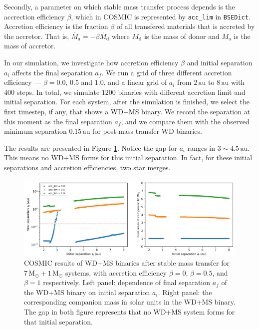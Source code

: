 \documentclass[12pt]{article}
\newcommand{\Msun}{\,\mathrm{M_{\odot}}}
\newcommand{\au}{\, \mathrm{au}}
\newcommand{\Md}{M_{\mathrm{d}}}
\newcommand{\Ma}{M_{\mathrm{a}}}
\begin{document}
Secondly, a parameter on which stable mass transfer process depends is the accrection efficiency $\beta$, which in COSMIC is represented by \verb|acc_lim| in \verb|BSEDict|. Accretion efficiency is the fraction $\beta$ of all transfered materials that is accreted by the accretor. That is, $\dot{\Ma} = -\beta\dot{\Md}$ where $\Md$ is the mass of donor and $\Ma$ is the mass of accretor.

In our simulation, we investigate how accretion efficiency $\beta$ and initial separation $a_i$ affects the final separation $a_f$. We run a grid of three different accretion efficiency — $\beta = 0.0$, $0.5$ and $1.0$, and a linear grid of $a_i$ from $2 \au$ to $8 \au$ with $400$ steps. In total, we simulate $1200$ binaries with different accretion limit and initial separation. For each system, after the simulation is finished, we select the first timestep, if any, that shows a WD+MS binary. We record the separation at this moment as the final separation $a_f$, and we compare them with the observed minimum separation $0.15 \au$ for post-mass transfer WD binaries.

The results are presented in Figure \ref{stable_hi}. Notice the gap for $a_i$ ranges in $3 \sim 4.5 \au$. This means no WD+MS forms for this initial separation. In fact, for these initial separations and accretion efficiencies, two star merges.

\begin{figure}
  \centering
  \includegraphics[width=0.75\linewidth]{fig/stable_hi_log.png}
  \caption{COSMIC results of WD+MS binaries after stable mass transfer for $7\Msun + 1\Msun$ systems, with accretion efficiency $\beta = 0$, $\beta = 0.5$, and $\beta = 1$ respectively. Left panel: dependence of final separation $a_f$ of the WD+MS binary on initial separation $a_i$. Right panel: the corresponding companion mass in solar units in the WD+MS binary. The gap in both figure represents that no WD+MS system forms for that initial separation.}
  \label{stable_hi}
\end{figure}
\end{document}
